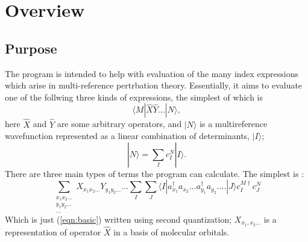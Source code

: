 \documentclass[12pt]{article}
\begin{document}
\section {Overview}
\subsection{Purpose}
The program is intended to help with evaluation of the many index expressions
which arise in multi-reference pertrbation theory.  Essentially, it aims to
evaluate one of the follwing three kinds of expressions, the simplest of which
is
\begin{equation}
\langle M | \hat{X} \hat{Y} ... | N \rangle,
\label{eqn:basic}
\end{equation}
\noindent here $\hat{X}$ and $\hat{Y}$ are some arbitrary operators, and $| N
\rangle$  is a multireference wavefunction represented as a linear combination
of determinants, $|I\rangle $; \begin{equation}
|N\rangle = \sum_{I} c_{I}^{N}| I \rangle.
\end{equation} 
\noindent There are three main types of terms the program can calculate. The simplest is :
\begin{equation}
\sum_{\substack{ x_{1}x_{2}...\\ y_{1}y_{2}... \\ ...}} X_{x_{1}x_{2}...} Y_{y_{1}y_{2}...} ...
\sum_{I}\sum_{J}
\langle I | a^{\dagger}_{x_{1}} a_{x_{2}}...a^{\dagger}_{y_{1}}a_{y_{2}}....| J \rangle 
 c^{M \dagger}_{I}c^{N}_{J}
\label{eqn:basic_2nd_quantized}
\end{equation}
\noindent  Which is just (\ref{eqn:basic}) written using second quantization;
$X_{x_{1},x_{2}...}$ is a representation of operator $\hat{X}$ in a basis of
molecular orbitals. \\
\end{document}
